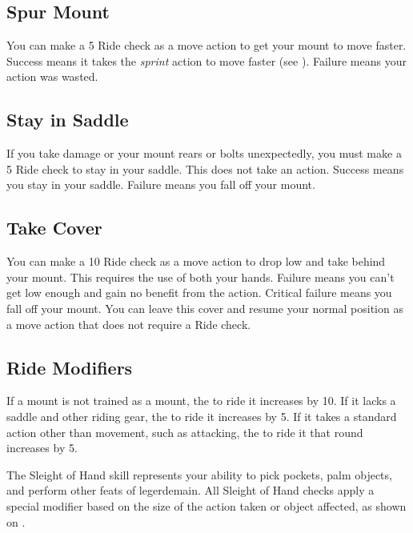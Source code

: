     \subsection{Spur Mount}
        You can make a  5 Ride check as a move action to get your mount to move faster. Success means it takes the \textit{sprint} action to move faster (see ).
        Failure means your action was wasted.

    \subsection{Stay in Saddle}
        If you take damage or your mount rears or bolts unexpectedly, you must make a  5 Ride check to stay in your saddle. This does not take an action. Success means you stay in your saddle. Failure means you fall off your mount.

    \subsection{Take Cover}
        You can make a  10 Ride check as a move action to drop low and take  behind your mount. This requires the use of both your hands. Failure means you can't get low enough and gain no benefit from the action. Critical failure means you fall off your mount. You can leave this cover and resume your normal position as a move action that does not require a Ride check.

    \subsection{Ride Modifiers}\label{Ride Modifiers}
        If a mount is not trained as a mount, the  to ride it increases by 10.
        If it lacks a saddle and other riding gear, the  to ride it increases by 5. If it takes a standard action other than movement, such as attacking, the  to ride it that round increases by 5.

\newpage
{}
        The Sleight of Hand skill represents your ability to pick pockets, palm objects, and perform other feats of legerdemain.
        All Sleight of Hand checks apply a special modifier based on the size of the action taken or object affected, as shown on .

